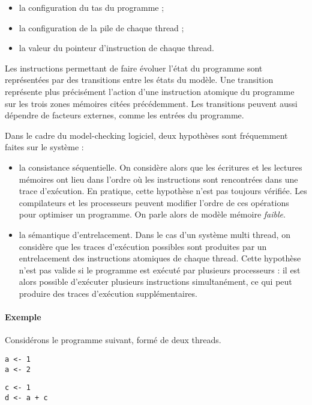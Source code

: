 \begin{itemize}
\item
  la configuration du tas du programme ;
\item
  la configuration de la pile de chaque thread ;
\item
  la valeur du pointeur d'instruction de chaque thread.
\end{itemize}

Les instructions permettant de faire évoluer l'état du programme sont
représentées par des transitions entre les états du modèle. Une transition
représente plus précisément l'action d'une instruction atomique du programme sur
les trois zones mémoires citées précédemment. Les transitions peuvent aussi
dépendre de facteurs externes, comme les entrées du programme.

Dans le cadre du model-checking logiciel, deux hypothèses sont fréquemment
faites sur le système :

\begin{itemize}
\item
  la consistance séquentielle. On considère alors que les écritures et
  les lectures mémoires ont lieu dans l'ordre où les instructions sont
  rencontrées dans une trace d'exécution. En pratique, cette hypothèse
  n'est pas toujours vérifiée. Les compilateurs et les processeurs
  peuvent modifier l'ordre de ces opérations pour optimiser un
  programme. On parle alors de modèle mémoire \emph{faible}.
\item
  la sémantique d'entrelacement. Dans le cas d'un système multi thread,
  on considère que les traces d'exécution possibles sont produites par
  un entrelacement des instructions atomiques de chaque thread. Cette
  hypothèse n'est pas valide si le programme est exécuté par plusieurs
  processeurs : il est alors possible d'exécuter plusieurs instructions
  simultanément, ce qui peut produire des traces d'exécution
  supplémentaires.
\end{itemize}

\paragraph{Exemple}

Considérons le programme suivant, formé de deux threads.

\noindent\begin{minipage}{.45\textwidth}
\begin{lstlisting}[caption=Thread 1, frame=tlrb]
a <- 1
a <- 2
\end{lstlisting}
\end{minipage}\hfill
\begin{minipage}{.45\textwidth}
\begin{lstlisting}[caption=Thread 2,frame=tlrb]
c <- 1
d <- a + c
\end{lstlisting}
\end{minipage}


